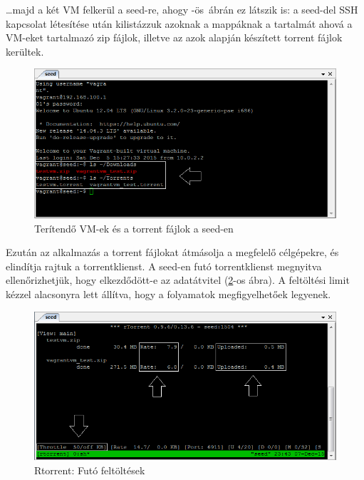 
\ldots majd a két VM felkerül a seed-re, ahogy -ös~ábrán ez látszik is:  a seed-del SSH kapcsolat létesítése után kilistázzuk azoknak a mappáknak a tartalmát ahová a VM-eket tartalmazó zip fájlok, illetve az azok alapján készített torrent fájlok kerültek.

\begin{figure}[ht]
\centering
\includegraphics[width=140mm, keepaspectratio]{figures/test_seed_files.png}
\caption{Terítendő VM-ek és a torrent fájlok a seed-en}
\label{fig:seed_files}
\end{figure}

Ezután az alkalmazás a torrent fájlokat átmásolja a megfelelő célgépekre, és elindítja rajtuk a torrentklienst. A seed-en futó torrentklienst megnyitva ellenőrizhetjük, hogy elkezdődött-e az adatátvitel (\ref{fig:seed_torrent}-os ábra). A feltöltési limit kézzel alacsonyra lett állítva, hogy a folyamatok megfigyelhetőek legyenek.

\begin{figure}[ht]
\centering
\includegraphics[width=140mm, keepaspectratio]{figures/test_seed_torrent.png}
\caption{Rtorrent: Futó feltöltések}
\label{fig:seed_torrent}
\end{figure}

